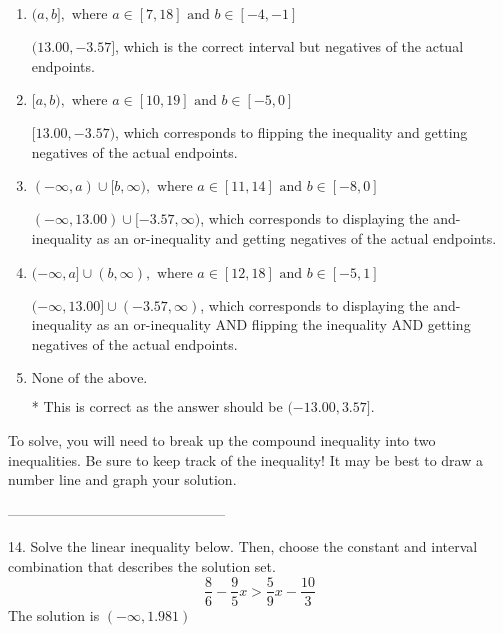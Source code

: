 \documentclass{extbook}[14pt]
\begin{document}
\begin{enumerate}[label=\Alph*.] 
\item $ (a, b], \text{ where } a \in [7, 18] \text{ and } b \in [-4, -1] $ 

 $(13.00, -3.57]$, which is the correct interval but negatives of the actual endpoints. 
\item $ [a, b), \text{ where } a \in [10, 19] \text{ and } b \in [-5, 0] $ 

 $[13.00, -3.57)$, which corresponds to flipping the inequality and getting negatives of the actual endpoints. 
\item $ (-\infty, a) \cup [b, \infty), \text{ where } a \in [11, 14] \text{ and } b \in [-8, 0] $ 

 $(-\infty, 13.00) \cup [-3.57, \infty)$, which corresponds to displaying the and-inequality as an or-inequality and getting negatives of the actual endpoints. 
\item $ (-\infty, a] \cup (b, \infty), \text{ where } a \in [12, 18] \text{ and } b \in [-5, 1] $ 

 $(-\infty, 13.00] \cup (-3.57, \infty)$, which corresponds to displaying the and-inequality as an or-inequality AND flipping the inequality AND getting negatives of the actual endpoints. 
\item $ \text{None of the above.} $ 

 * This is correct as the answer should be $(-13.00, 3.57]$. 
\end{enumerate} 
 
To solve, you will need to break up the compound inequality into two inequalities. Be sure to keep track of the inequality! It may be best to draw a number line and graph your solution.

-----------------------------------------------

14. Solve the linear inequality below. Then, choose the constant and interval combination that describes the solution set.
\[ \frac{8}{6} - \frac{9}{5} x > \frac{5}{9} x - \frac{10}{3} \] 
The solution is $ (-\infty, 1.981) $ 
\end{document}
